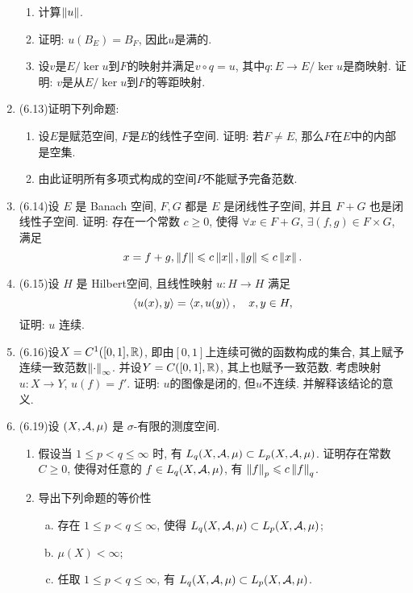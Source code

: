 \begin{enumerate}[label=\textbf{\arabic*.}, ref=\arabic*]
\begin{enumerate}[(1)]
		      \item 计算$ \left\| u \right\| $.
		      \item 证明: $ u(B_E)=B_F $, 因此$ u $是满的.
		      \item 设$ v $是$ E/\ker u $到$ F $的映射并满足$ v\circ q=u $, 其中$ q : E\to E/\ker u $是商映射. 证明: $ v $是从$ E/\ker u $到$ F $的等距映射.
	      \end{enumerate}
	\item (6.13)证明下列命题:
	      \begin{enumerate}[(1)]
		      \item 设$ E $是赋范空间, $ F $是$ E $的线性子空间. 证明: 若$ F\ne E $, 那么$ F $在$ E $中的内部是空集.
		      \item 由此证明所有多项式构成的空间$ P $不能赋予完备范数.
	      \end{enumerate}
	\item (6.14)设 $ E $ 是 Banach 空间, $ F, G $ 都是 $ E $ 是闭线性子空间, 并且 $ F+G $ 也是闭线性子空间. 证明: 存在一个常数 $ c\geqslant0 $, 使得 $ \forall x\in F+G $, $ \exists(f, g)\in F\times G $, 满足
	      \[
		      x=f+g, \left\| f \right\|\leqslant c\left\| x \right\|, \left\| g \right\|\leqslant c\left\| x \right\|.
	      \]
	\item (6.15)设 $ H $ 是 Hilbert空间, 且线性映射 $ u:H\to H $ 满足
	      \[
		      \left\langle u(x), y \right\rangle=\left\langle x, u(y) \right\rangle, \quad x, y\in H,
	      \]
	      证明: $ u $ 连续.
	\item (6.16)设$ X=C^1([0,1],\mathbb{R}) $, 即由$ [0,1] $上连续可微的函数构成的集合, 其上赋予连续一致范数$ \left\| \cdot \right\|_\infty $. 并设$ Y=C([0,1],\mathbb{R}) $, 其上也赋予一致范数. 考虑映射$ u : X\to Y $, $ u(f)=f' $. 证明: $ u $的图像是闭的, 但$ u $不连续. 并解释该结论的意义.
	\item (6.19)设 $ (X, \mathcal{A}, \mu) $ 是 $ \sigma $-有限的测度空间.
	      \begin{enumerate}[(1)]
		      \item 假设当 $ 1\leqslant p<q\leqslant\infty $ 时, 有 $ L_{q}(X, \mathcal{A}, \mu)\subset L_{p}(X, \mathcal{A}, \mu) $. 证明存在常数 $ C\geqslant0 $, 使得对任意的 $ f\in L_{q}(X, \mathcal{A}, \mu) $, 有 $ \left\| f \right\|_{p}\leqslant c\left\| f \right\|_{q} $.
		      \item 导出下列命题的等价性
		            \begin{enumerate}[a. ]
			            \item 存在 $ 1\leqslant p<q\leqslant\infty $, 使得 $ L_{q}(X, \mathcal{A}, \mu)\subset L_{p}(X, \mathcal{A}, \mu) $;
			            \item $ \mu(X)<\infty $;
			            \item 任取 $ 1\leqslant p<q\leqslant\infty $, 有 $ L_{q}(X, \mathcal{A}, \mu)\subset L_{p}(X, \mathcal{A}, \mu) $.

\end{enumerate}
\end{enumerate}
\end{enumerate}
